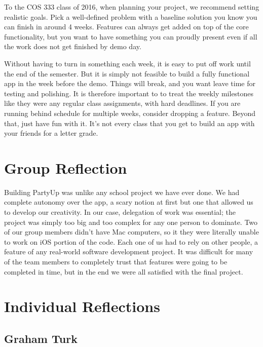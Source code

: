 \documentclass[12pt]{article}
\begin{document}
To the COS 333 class of 2016, when planning your project, we recommend setting realistic goals. 
Pick a well-defined problem with a baseline solution you know you can finish in around 4 weeks.
Features can always get added on top of the core functionality, but you want to have something you
can proudly present even if all the work does not get finished by demo day.

Without having to turn in something each week, it is easy to put off work until the end of the semester.
But it is simply not feasible to build a fully functional app in the week before the demo. 
Things will break, and you want leave time for testing and polishing.
It is therefore important to to treat the weekly milestones like they were any regular class assignments, with hard deadlines. 
If you are running behind schedule for multiple weeks, consider dropping a feature.
Beyond that, just have fun with it. It's not every class that you get to build an app with your friends for a letter grade.

\section{Group Reflection}

Building PartyUp was unlike any school project we have ever done. 
We had complete autonomy over the app, a scary notion at first but one that allowed us to develop our creativity. 
In our case, delegation of work was essential; the project was simply too big and too complex for any one person to dominate. 
Two of our group members didn't have Mac computers, so it they were literally unable to work on iOS portion of the code. 
Each one of us had to rely on other people, a feature of any real-world software development project. 
It was difficult for many of the team members to completely trust that features were going to be completed in time, but in the end we were all satisfied with the final project.

\bigskip

\section{Individual Reflections}

\subsection{Graham Turk}
\end{document}
